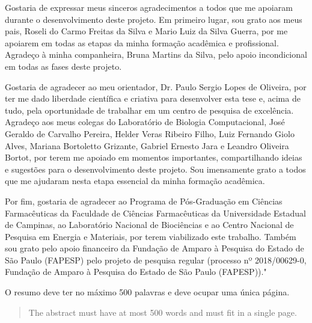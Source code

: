 \documentclass[Portugues]{phdquali}
\begin{document}

Gostaria de expressar meus sinceros agradecimentos a todos que me apoiaram durante o desenvolvimento deste projeto. Em primeiro lugar, sou grato aos meus pais, Roseli do Carmo Freitas da Silva e Mario Luiz da Silva Guerra, por me apoiarem em todas as etapas da minha formação acadêmica e profissional. Agradeço à minha companheira, Bruna Martins da Silva, pelo apoio incondicional em todas as fases deste projeto.

Gostaria de agradecer ao meu orientador, Dr. Paulo Sergio Lopes de Oliveira, por ter me dado liberdade científica e criativa para desenvolver esta tese e, acima de tudo, pela oportunidade de trabalhar em um centro de pesquisa de excelência. Agradeço aos meus colegas do Laboratório de Biologia Computacional, José Geraldo de Carvalho Pereira, Helder Veras Ribeiro Filho, Luiz Fernando Giolo Alves, Mariana Bortoletto Grizante, Gabriel Ernesto Jara e Leandro Oliveira Bortot, por terem me apoiado em momentos importantes, compartilhando ideias e sugestões para o desenvolvimento deste projeto. Sou imensamente grato a todos que me ajudaram nesta etapa essencial da minha formação acadêmica.

Por fim, gostaria de agradecer ao Programa de Pós-Graduação em Ciências Farmacêuticas da Faculdade de Ciências Farmacêuticas da Universidade Estadual de Campinas, ao Laboratório Nacional de Biociências e ao Centro Nacional de Pesquisa em Energia e Materiais, por terem viabilizado este trabalho. Também sou grato pelo apoio financeiro da Fundação de Amparo à Pesquisa do Estado de São Paulo (FAPESP) pelo projeto de pesquisa regular (processo nº 2018/00629-0, Fundação de Amparo à Pesquisa do Estado de São Paulo (FAPESP))."


\begin{resumo}
O resumo deve ter no máximo 500 palavras e deve ocupar uma única página.
\end{resumo}


\begin{abstract}
The abstract must have at most 500 words and must fit in a single page.
\end{abstract}


\end{document}
